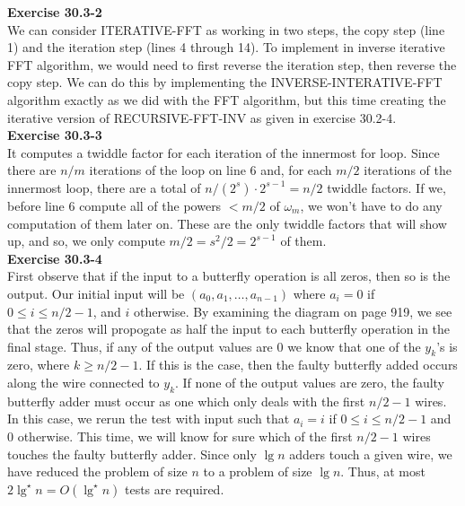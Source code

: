 \documentclass{article}
\begin{document}
\noindent\textbf{Exercise 30.3-2}\\

We can consider ITERATIVE-FFT as working in two steps, the copy step (line 1) and the iteration step (lines 4 through 14).  To implement in inverse iterative FFT algorithm, we would need to first reverse the iteration step, then reverse the copy step.  We can do this by implementing the INVERSE-INTERATIVE-FFT algorithm exactly as we did with the FFT algorithm, but this time creating the iterative version of RECURSIVE-FFT-INV as given in exercise 30.2-4.  \\


\noindent\textbf{Exercise 30.3-3}\\

It computes a twiddle factor for each iteration of the innermost for loop. Since there are $n/m$ iterations of the loop on line 6 and, for each $m/2$ iterations of the innermost loop, there are a total of $n/(2^s)\cdot2^{s-1} =n/2$ twiddle factors. If we, before line 6 compute all of the powers $<m/2$ of $\omega_m$, we won't have to do any computation of them later on. These are the only twiddle factors that will show up, and so, we only compute $m/2 = s^2/2 = 2^{s-1}$ of them.\\

\noindent\textbf{Exercise 30.3-4}\\

First observe that if the input to a butterfly operation is all zeros, then so is the output.  Our initial input will be $(a_0,a_1,\ldots, a_{n-1})$ where $a_i = 0$ if $0 \leq i \leq n/2-1$, and $i$ otherwise.  By examining the diagram on page 919, we see that the zeros will propogate as half the input to each butterfly operation in the final stage. Thus, if any of the output values are 0 we know that one of the $y_k$'s is zero, where $k \geq n/2-1$.  If this is the case, then the faulty butterfly added occurs along the wire connected to $y_k$.  If none of the output values are zero, the faulty butterfly adder must occur as one which only deals with the first $n/2-1$ wires.  In this case, we rerun the test with input such that $a_i = i$ if $0 \leq i \leq n/2-1$ and 0 otherwise.  This time, we will know for sure which of the first $n/2-1$ wires touches the faulty butterfly adder.  Since only $\lg n$ adders touch a given wire, we have reduced the problem of size $n$ to a problem of size $\lg n$. Thus, at most $2\lg^\star n = O(\lg^\star n)$ tests are required. \\
\end{document}
